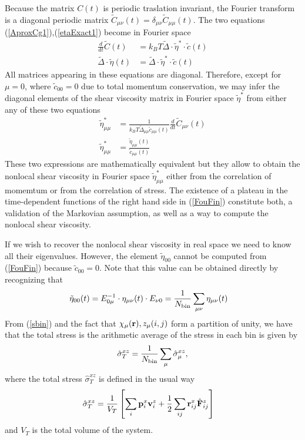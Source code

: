 \documentclass[b5paper,openright,10pt]{book}
\newcommand{\esc}{\!\cdot\!}
\begin{document}
Because  the  matrix  $C(t)$  is periodic  traslation  invariant,  the
Fourier     transform     is     a    diagonal     periodic     matrix
$\tilde{C}_{\mu\nu}(t)=\delta_{\mu\nu}\tilde{C}_{\mu\mu}(t)$.
The two equations (\ref{AproxCg1}),(\ref{etaExact1}) become in Fourier space
\begin{align}
  \frac{d}{dt}\tilde{C}(t)&=  k_BT\tilde{\Delta}\esc \tilde{\eta}^*\esc \tilde{c}(t)
\nonumber\\
 \tilde{\Delta}\esc \tilde{\eta}(t) &=\tilde{\Delta}\esc \tilde{\eta}^*\esc \tilde{c}(t)
\label{Fou1}
\end{align}
All matrices  appearing in  these equations are  diagonal.  Therefore,
except  for $\mu=0$,  where $\tilde{c}_{00}=0$  due to  total momentum
conservation,  we  may  infer  the  diagonal  elements  of  the  shear
viscosity matrix in Fourier space  $\tilde{\eta}^*$ from either any of
these two equations
\begin{align}
  \tilde{\eta}^*_{\mu\mu}&= \frac{1}{ k_BT\tilde{\Delta}_{\mu\mu}  \tilde{c}_{\mu\mu}(t)}\frac{d}{dt}\tilde{C}_{\mu\nu}(t)
\nonumber\\
\tilde{\eta}_{\mu\mu}^*&=\frac{\tilde{\eta}_{\mu\mu}(t) }{\tilde{c}_{\mu\mu}(t)}
\label{FouFin}
\end{align}
These two expressions are mathematically  equivalent but they allow to
obtain   the    nonlocal   shear    viscosity   in    Fourier   space
$\tilde{\eta}_{\mu\mu}^*$ either  from the correlation of  momemtum or
from the  correlation of stress.   The existence  of a plateau  in the
time-dependent  functions of  the  right hand  side in  (\ref{FouFin})
constitute both, a validation of  the Markovian assumption, as well as
a way to compute the nonlocal shear viscosity.

If we wish  to recover the nonlocal shear viscosity  in real space we
need   to  know   all   their  eigenvalues.    However,  the   element
$\tilde{\eta}_{00}$  cannot be  computed  from (\ref{FouFin})  because
$\tilde{c}_{00}=0$.  Note that this value  can be obtained directly by
recognizing that
\begin{align}
    \tilde{\eta}_{00}(t)&=E_{0\mu}^{-1}\cdot\eta_{\mu\nu}(t)\cdot E_{\nu 0}=\frac{1}{N_{\rm bin}}
\sum_{\mu\nu}\eta_{\mu\nu}(t)
\label{eta00}
\end{align}
From
(\ref{sbin}) and the fact that $\chi_\mu({\bf r}),z_{\mu}(i,j)$ form a partition of unity, we have
that the total stress is the arithmetic average of the stress in each bin is given by
\begin{align}
\hat{\sigma}_T^{xz}=\frac{1}{N_{\rm bin}}\sum_\mu\hat{\sigma}_\mu^{xz},
\label{TotStress2}
\end{align}
where the  total stress $\hat\sigma_T^{xz}$ is defined  in the usual way
\begin{align}
\hat{\sigma}_T^{xz}&=\frac{1}{V_T}\left[\sum_{i}{\bf p}^x_i{\bf v}^z_i
+\frac{1}{2}\sum_{ij}{\bf r}^x_{ij}\hat{\bf F}^z_{ij}\right]
\label{TotStress}
\end{align}
and $V_T$ is the total volume of the system. 
\end{document}
